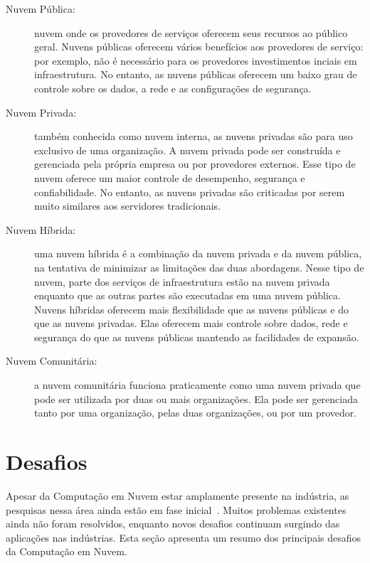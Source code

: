 	\begin{description}
	
		\item[Nuvem Pública:] nuvem onde os provedores de serviços oferecem seus recursos ao público geral. Nuvens públicas oferecem vários benefícios aos provedores de serviço: por exemplo, não é necessário para os provedores investimentos inciais em infraestrutura. No entanto, as nuvens públicas oferecem um baixo grau de controle sobre os dados, a rede e as configurações de segurança.  	 
			
		\item[Nuvem Privada:] também conhecida como nuvem interna, as nuvens privadas são para uso exclusivo de uma organização. A nuvem privada pode ser construída e gerenciada pela própria empresa ou por provedores externos. Esse tipo de nuvem oferece um maior controle de desempenho, segurança e confiabilidade. No entanto, as nuvens privadas são criticadas por serem muito similares aos servidores tradicionais.
		
		\item[Nuvem Híbrida:] uma nuvem híbrida é a combinação da nuvem privada e da nuvem pública, na tentativa de minimizar as limitações das duas abordagens. Nesse tipo de nuvem, parte dos serviços de infraestrutura estão na nuvem privada enquanto que as outras partes são executadas em uma nuvem pública. Nuvens híbridas oferecem mais flexibilidade que as nuvens públicas e do que as nuvens privadas. Elas oferecem mais controle sobre dados, rede e segurança do que as nuvens públicas mantendo as facilidades de expansão.
		
		\item[Nuvem Comunitária:] a nuvem comunitária funciona praticamente como uma nuvem privada que pode ser utilizada por duas ou mais organizações. Ela pode ser gerenciada tanto por uma organização, pelas duas organizações, ou por um provedor.
		 	
	\end{description}
	
\section{Desafios} \label{cloud:chal}

	Apesar da Computação em Nuvem estar amplamente presente na indústria, as pesquisas nessa área ainda estão em fase inicial~\cite{stateOfArt:2010}.  Muitos problemas existentes ainda não foram resolvidos, enquanto novos desafios continuam surgindo das aplicações nas indústrias. Esta seção apresenta um resumo dos principais desafios da Computação em Nuvem. 
	
